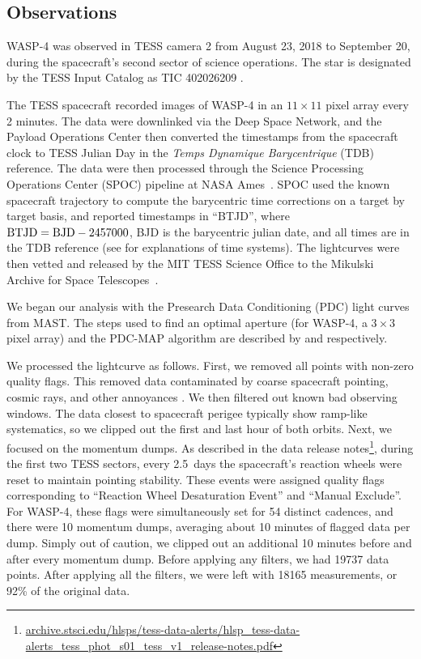 \documentclass[12pt,twocolumn,tighten]{aastex62}
\begin{document}
\subsection{Observations}
\label{sec:observations}

WASP-4 was observed in TESS camera 2 from August 23, 2018 to September
20, during the spacecraft's second sector of science operations.  The
star is designated by the TESS Input Catalog as TIC 402026209
\citep{stassun_TIC_2018}.

The TESS spacecraft recorded images of WASP-4 in an $11\times11$ pixel
array every 2 minutes.   The data were downlinked via the Deep Space
Network, and the Payload Operations Center then converted the
timestamps from the spacecraft clock to TESS Julian Day in the {\it
Temps Dynamique Barycentrique} (TDB) reference.  The data were then
processed through the Science Processing Operations Center (SPOC)
pipeline at NASA Ames~\citep{jenkins_tess_2016}.  SPOC used the known
spacecraft trajectory to compute the barycentric time corrections on a
target by target basis, and reported timestamps in ``BTJD'', where
${\rm BTJD} = {\rm BJD} - 2457000$, BJD is the barycentric julian
date, and all times are in the TDB reference (see
\citealt{urban_explanatory_2012} for explanations of time systems).
The lightcurves were then vetted and released by the MIT TESS Science
Office to the Mikulski Archive for Space
Telescopes~\citep{ricker_tess_alerts_2018}.

We began our analysis with the Presearch Data Conditioning (PDC) light
curves from MAST.  The steps used to find an optimal aperture (for
WASP-4, a $3\times 3$ pixel array) and the PDC-MAP algorithm are
described by \citet{smith_kepler_apertures_2017} and
\citet{smith_kepler_PDC_2017} respectively.

We processed the lightcurve as follows.  First, we removed all
points with non-zero quality flags.  This removed data contaminated by
coarse spacecraft pointing, cosmic rays, and other annoyances
\citep{tess_data_product_description_2018}.  We then filtered out
known bad observing windows.  The data closest to spacecraft perigee
typically show ramp-like systematics, so we clipped out the first and
last hour of both orbits.  Next, we focused on the momentum dumps. As
described in the data release
notes\footnote{\url{archive.stsci.edu/hlsps/tess-data-alerts/hlsp_tess-data-alerts_tess_phot_s01_tess_v1_release-notes.pdf}},
during the first two TESS sectors, every 2.5~days the spacecraft's
reaction wheels were reset to maintain pointing stability.  These
events were assigned quality flags corresponding to ``Reaction Wheel
Desaturation Event'' and ``Manual Exclude''.  For WASP-4, these flags
were simultaneously set for 54 distinct cadences, and there were 10
momentum dumps, averaging about 10 minutes of flagged data per dump.
Simply out of caution, we clipped out an additional 10 minutes before
and after every momentum dump.  Before applying any filters, we had
19737 data points. After applying all the filters, we were left with
18165 measurements, or 92\% of the original data.
\end{document}
